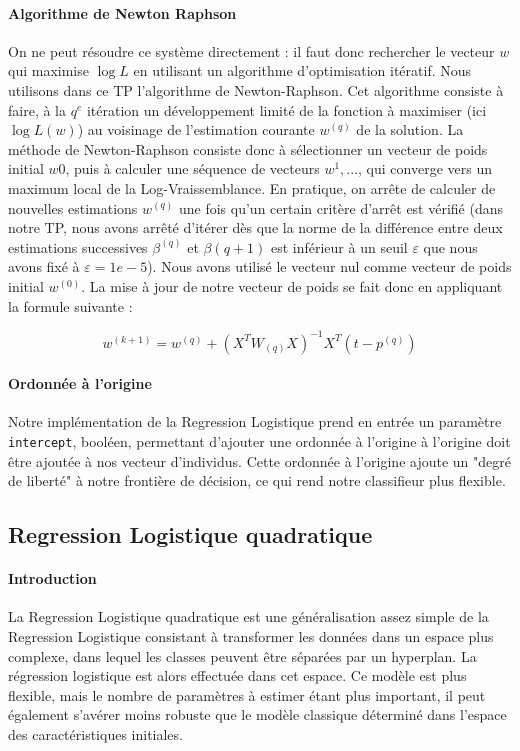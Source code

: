 \documentclass{report}
\begin{document}
\paragraph{Algorithme de Newton Raphson}
On ne peut résoudre ce système directement : il faut donc rechercher le vecteur $w$ qui maximise $\log L$ en utilisant un algorithme d'optimisation itératif. Nous utilisons dans ce TP l'algorithme de Newton-Raphson. Cet algorithme consiste à faire, à la $q^e$ itération un développement limité de la fonction à maximiser (ici $\log L(w)$) au voisinage de l'estimation courante $w^{(q)}$ de la solution. La méthode de Newton-Raphson consiste donc à sélectionner un vecteur de poids initial $w{0}$, puis à calculer une séquence de vecteurs $w^1, ...$, qui converge vers un maximum local de la Log-Vraissemblance. En pratique, on arrête de calculer de nouvelles estimations $w^{(q)}$ une fois qu'un certain critère d'arrêt est vérifié (dans notre TP, nous avons arrêté d'itérer dès que la norme de la différence entre deux estimations successives $\beta^{(q)}$ et $\beta{(q+1)}$ est inférieur à un seuil $\varepsilon$ que nous avons fixé à $\varepsilon = 1e -5$). Nous avons utilisé le vecteur nul comme vecteur de poids initial $w^{(0)}$. La mise à jour de notre vecteur de poids se fait donc en appliquant la formule suivante :


$$w^{(k+1)} = w^{(q)} + (X^T W_{(q)}X)^{-1}X^T(t-p^{(q)})$$

\paragraph{Ordonnée à l'origine}
Notre implémentation de la Regression Logistique prend en entrée un paramètre \verb+intercept+, booléen, permettant d'ajouter une ordonnée à l'origine à l'origine doit être ajoutée à nos vecteur d'individus. Cette ordonnée à l'origine ajoute un "degré de liberté" à notre frontière de décision, ce qui rend notre classifieur plus flexible.


\subsection{Regression Logistique quadratique}
\paragraph{Introduction}
La Regression Logistique quadratique est une généralisation assez simple de la Regression Logistique consistant à transformer les données dans un espace plus complexe, dans lequel les classes peuvent être séparées par un hyperplan. La régression logistique est alors effectuée dans cet espace. Ce modèle est plus flexible, mais le nombre de paramètres à estimer étant plus important, il peut également s'avérer moins robuste que le modèle classique déterminé dans l'espace des caractéristiques initiales.
\end{document}
